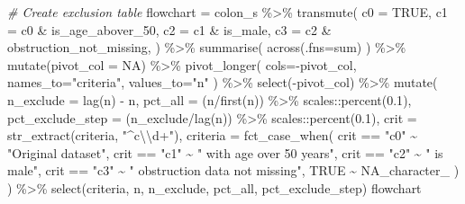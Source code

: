 \documentclass[
]{book}
\newenvironment{Shaded}{\begin{snugshade}}{\end{snugshade}}
\newcommand{\AttributeTok}[1]{\textcolor[rgb]{0.77,0.63,0.00}{#1}}
\newcommand{\CommentTok}[1]{\textcolor[rgb]{0.56,0.35,0.01}{\textit{#1}}}
\newcommand{\ConstantTok}[1]{\textcolor[rgb]{0.00,0.00,0.00}{#1}}
\newcommand{\FloatTok}[1]{\textcolor[rgb]{0.00,0.00,0.81}{#1}}
\newcommand{\FunctionTok}[1]{\textcolor[rgb]{0.00,0.00,0.00}{#1}}
\newcommand{\NormalTok}[1]{#1}
\newcommand{\OtherTok}[1]{\textcolor[rgb]{0.56,0.35,0.01}{#1}}
\newcommand{\SpecialCharTok}[1]{\textcolor[rgb]{0.00,0.00,0.00}{#1}}
\newcommand{\StringTok}[1]{\textcolor[rgb]{0.31,0.60,0.02}{#1}}
\begin{document}
\begin{Shaded}
\begin{Highlighting}[]
\CommentTok{\# Create exclusion table}
\NormalTok{flowchart }\OtherTok{=}\NormalTok{ colon\_s }\SpecialCharTok{\%\textgreater{}\%} 
  \FunctionTok{transmute}\NormalTok{(}
  \AttributeTok{c0 =} \ConstantTok{TRUE}\NormalTok{,}
  \AttributeTok{c1 =}\NormalTok{ c0 }\SpecialCharTok{\&}\NormalTok{ is\_age\_abover\_50,}
  \AttributeTok{c2 =}\NormalTok{ c1 }\SpecialCharTok{\&}\NormalTok{ is\_male,}
  \AttributeTok{c3 =}\NormalTok{ c2 }\SpecialCharTok{\&}\NormalTok{ obstruction\_not\_missing,}
\NormalTok{) }\SpecialCharTok{\%\textgreater{}\%}
  \FunctionTok{summarise}\NormalTok{(}
    \FunctionTok{across}\NormalTok{(}\AttributeTok{.fns=}\NormalTok{sum)}
\NormalTok{  ) }\SpecialCharTok{\%\textgreater{}\%}
  \FunctionTok{mutate}\NormalTok{(}\AttributeTok{pivot\_col =} \ConstantTok{NA}\NormalTok{) }\SpecialCharTok{\%\textgreater{}\%} 
  \FunctionTok{pivot\_longer}\NormalTok{(}
    \AttributeTok{cols=}\SpecialCharTok{{-}}\NormalTok{pivot\_col,}
    \AttributeTok{names\_to=}\StringTok{"criteria"}\NormalTok{,}
    \AttributeTok{values\_to=}\StringTok{"n"}
\NormalTok{  ) }\SpecialCharTok{\%\textgreater{}\%} 
  \FunctionTok{select}\NormalTok{(}\SpecialCharTok{{-}}\NormalTok{pivot\_col) }\SpecialCharTok{\%\textgreater{}\%} 
  \FunctionTok{mutate}\NormalTok{(}
    \AttributeTok{n\_exclude =} \FunctionTok{lag}\NormalTok{(n) }\SpecialCharTok{{-}}\NormalTok{ n,}
    \AttributeTok{pct\_all =}\NormalTok{ (n}\SpecialCharTok{/}\FunctionTok{first}\NormalTok{(n)) }\SpecialCharTok{\%\textgreater{}\%}\NormalTok{ scales}\SpecialCharTok{::}\FunctionTok{percent}\NormalTok{(}\FloatTok{0.1}\NormalTok{),}
    \AttributeTok{pct\_exclude\_step =}\NormalTok{ (n\_exclude}\SpecialCharTok{/}\FunctionTok{lag}\NormalTok{(n)) }\SpecialCharTok{\%\textgreater{}\%}\NormalTok{ scales}\SpecialCharTok{::}\FunctionTok{percent}\NormalTok{(}\FloatTok{0.1}\NormalTok{),}
    \AttributeTok{crit =} \FunctionTok{str\_extract}\NormalTok{(criteria, }\StringTok{"\^{}c}\SpecialCharTok{\textbackslash{}\textbackslash{}}\StringTok{d+"}\NormalTok{),}
    \AttributeTok{criteria =} \FunctionTok{fct\_case\_when}\NormalTok{(}
\NormalTok{      crit }\SpecialCharTok{==} \StringTok{"c0"} \SpecialCharTok{\textasciitilde{}} \StringTok{"Original dataset"}\NormalTok{,}
\NormalTok{      crit }\SpecialCharTok{==} \StringTok{"c1"} \SpecialCharTok{\textasciitilde{}} \StringTok{"  with age over 50 years"}\NormalTok{,}
\NormalTok{      crit }\SpecialCharTok{==} \StringTok{"c2"} \SpecialCharTok{\textasciitilde{}} \StringTok{"  is male"}\NormalTok{,}
\NormalTok{      crit }\SpecialCharTok{==} \StringTok{"c3"} \SpecialCharTok{\textasciitilde{}} \StringTok{"  obstruction data not missing"}\NormalTok{,}
      \ConstantTok{TRUE} \SpecialCharTok{\textasciitilde{}} \ConstantTok{NA\_character\_}
\NormalTok{    )}
\NormalTok{  ) }\SpecialCharTok{\%\textgreater{}\%} 
  \FunctionTok{select}\NormalTok{(criteria, n, n\_exclude, pct\_all, pct\_exclude\_step)}
\NormalTok{flowchart}
\end{Highlighting}
\end{Shaded}
\end{document}
